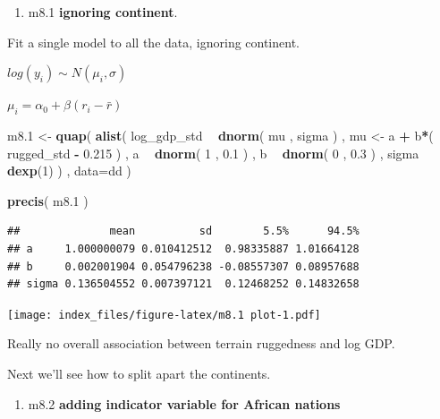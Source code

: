 \documentclass[
]{article}
\newenvironment{Shaded}{\begin{snugshade}}{\end{snugshade}}
\newcommand{\DataTypeTok}[1]{\textcolor[rgb]{0.13,0.29,0.53}{#1}}
\newcommand{\DecValTok}[1]{\textcolor[rgb]{0.00,0.00,0.81}{#1}}
\newcommand{\FloatTok}[1]{\textcolor[rgb]{0.00,0.00,0.81}{#1}}
\newcommand{\KeywordTok}[1]{\textcolor[rgb]{0.13,0.29,0.53}{\textbf{#1}}}
\newcommand{\NormalTok}[1]{#1}
\newcommand{\OperatorTok}[1]{\textcolor[rgb]{0.81,0.36,0.00}{\textbf{#1}}}
\newcommand{\StringTok}[1]{\textcolor[rgb]{0.31,0.60,0.02}{#1}}
\providecommand{\tightlist}{%
  \setlength{\itemsep}{0pt}\setlength{\parskip}{0pt}}
\begin{document}
\begin{enumerate}
\def\labelenumi{\arabic{enumi}.}
\tightlist
\item
  m8.1 \textbf{ignoring continent}.
\end{enumerate}

Fit a single model to all the data, ignoring continent.

\(log(y_i) \sim N(\mu_i, \sigma)\)

\(\mu_i = \alpha_0 + \beta (r_i - \bar{r})\)

\begin{Shaded}
\begin{Highlighting}[]
\NormalTok{m8}\FloatTok{.1}\NormalTok{ <-}\StringTok{ }\KeywordTok{quap}\NormalTok{(}
    \KeywordTok{alist}\NormalTok{(}
\NormalTok{        log_gdp_std }\OperatorTok{~}\StringTok{ }\KeywordTok{dnorm}\NormalTok{( mu , sigma ) ,}
\NormalTok{        mu <-}\StringTok{ }\NormalTok{a }\OperatorTok{+}\StringTok{ }\NormalTok{b}\OperatorTok{*}\NormalTok{( rugged_std }\OperatorTok{-}\StringTok{ }\FloatTok{0.215}\NormalTok{ ) ,}
\NormalTok{        a }\OperatorTok{~}\StringTok{ }\KeywordTok{dnorm}\NormalTok{( }\DecValTok{1}\NormalTok{ , }\FloatTok{0.1}\NormalTok{ ) ,}
\NormalTok{        b }\OperatorTok{~}\StringTok{ }\KeywordTok{dnorm}\NormalTok{( }\DecValTok{0}\NormalTok{ , }\FloatTok{0.3}\NormalTok{ ) ,}
\NormalTok{        sigma }\OperatorTok{~}\StringTok{ }\KeywordTok{dexp}\NormalTok{(}\DecValTok{1}\NormalTok{)}
\NormalTok{    ) , }\DataTypeTok{data=}\NormalTok{dd )}

 \KeywordTok{precis}\NormalTok{( m8}\FloatTok{.1}\NormalTok{ )}
\end{Highlighting}
\end{Shaded}

\begin{verbatim}
##              mean          sd        5.5%      94.5%
## a     1.000000079 0.010412512  0.98335887 1.01664128
## b     0.002001904 0.054796238 -0.08557307 0.08957688
## sigma 0.136504552 0.007397121  0.12468252 0.14832658
\end{verbatim}

\texttt{[image: index\_files/figure-latex/m8.1 plot-1.pdf]}

Really no overall association between terrain ruggedness and log GDP.

Next we'll see how to split apart the continents.

\begin{enumerate}
\def\labelenumi{\arabic{enumi}.}
\setcounter{enumi}{1}
\tightlist
\item
  m8.2 \textbf{adding indicator variable for African nations}
\end{enumerate}
\end{document}
